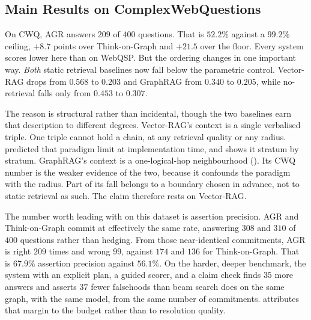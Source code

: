 \subsection{Main Results on ComplexWebQuestions}\label{sec:cwq-results}

On CWQ, AGR answers $209$ of $400$ questions. That is $52.2\%$ against a
$99.2\%$ ceiling, $+8.7$ points over
Think-on-Graph and $+21.5$ over the floor. Every system scores lower here than
on WebQSP. But the ordering changes in one important way. \emph{Both} static
retrieval baselines now fall below the parametric control. Vector-RAG drops from
$0.568$ to $0.203$ and GraphRAG from $0.340$ to $0.205$, while no-retrieval
falls only from $0.453$ to $0.307$.

The reason is structural rather than incidental, though the two baselines earn
that description to different degrees. Vector-RAG's context is a single
verbalised triple. One triple cannot hold a chain, at any retrieval quality or
any radius.  predicted that paradigm limit at implementation
time, and  shows it stratum by stratum. GraphRAG's context
is a one-logical-hop neighbourhood (). Its CWQ
number is the weaker evidence of the two, because it confounds the paradigm with
the radius. Part of its fall belongs to a boundary chosen in advance, not to
static retrieval as such. The claim therefore rests on Vector-RAG.

The number worth leading with on this dataset is assertion precision. AGR and
Think-on-Graph commit at effectively the same rate, answering $308$ and $310$ of
$400$ questions rather than hedging. From those near-identical commitments, AGR
is right $209$ times and wrong $99$, against $174$ and $136$ for Think-on-Graph.
That is $67.9\%$ assertion precision against $56.1\%$. On the harder, deeper
benchmark, the system with an explicit plan, a guided scorer, and a claim check
finds $35$ more answers and asserts $37$ fewer falsehoods than beam search does
on the same graph, with the same model, from the same number of commitments.
 attributes that margin to the budget rather than to
resolution quality.

